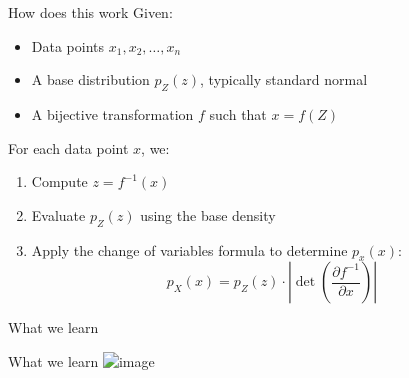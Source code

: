 \documentclass[aspectratio=169,xcolor=dvipsnames]{beamer}
\begin{document}
\begin{frame}{How does this work}
Given:
\begin{itemize}
  \item Data points \( x_1, x_2, \ldots, x_n \)
  \item A base distribution \( p_Z(z) \), typically standard normal
  \item A bijective transformation \( f \) such that \( x = f(Z) \)
\end{itemize}

For each data point \( x \), we:
\begin{enumerate}
  \item Compute \( z = f^{-1}(x) \)
  \item Evaluate \( p_Z(z) \) using the base density
  \item Apply the change of variables formula to determine \(p_x(x)\):  
  \[
  p_X(x) = p_Z(z) \cdot \left| \det \left( \frac{\partial f^{-1}}{\partial x} \right) \right|
  \]
\end{enumerate}
\end{frame}


\begin{frame}{What we learn}
  \begin{center}
    \centering
  \end{center}
\end{frame}


\begin{frame}{What we learn}
    \centering
    \includegraphics<4>[width=0.8\textwidth]{pictures/tof.png}
\end{frame}
\end{document}
